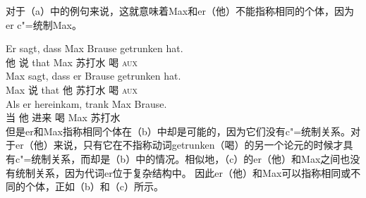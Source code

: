 对于（a）中的例句来说，这就意味着Max和er（他）不能指称相同的个体，因为er c"=统制Max。

\eal
\ex 
\gll Er sagt, dass Max Brause getrunken hat.\\
	 他 说 that Max 苏打水 喝 \textsc{aux}\\
\ex 
\gll Max sagt, dass er Brause getrunken hat.\\
	 Max 说 that 他 苏打水 喝 \textsc{aux}\\
\ex 
\gll Als er hereinkam, trank Max Brause.\\
	 当 他 进来 喝 Max 苏打水\\
\zl
但是er和Max指称相同个体在（b）中却是可能的，因为它们没有c"=统制关系。对于er（他）来说，只有它在不指称动词getrunken（喝）的另一个论元的时候才具有c"=统制关系，而却是（b）中的情况。相似地，（c）的er（他）和Max之间也没有统制关系，因为代词er位于复杂结构中。 因此er（他）和Max可以指称相同或不同的个体，正如（b）和（c）所示。

